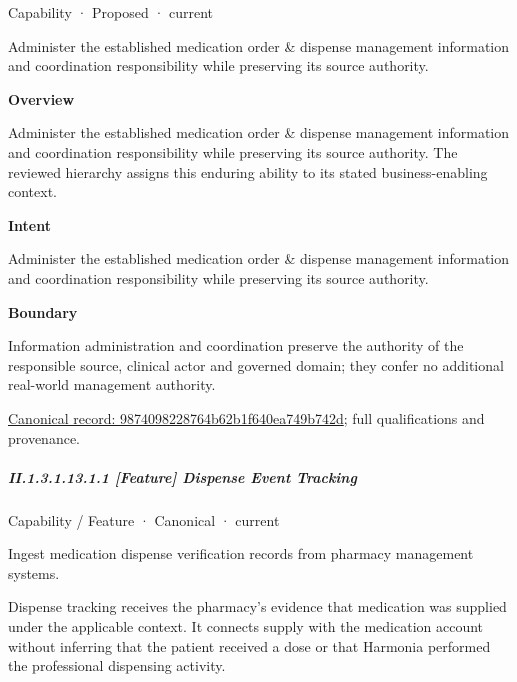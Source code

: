 \label{element:9874098228764b62b1f640ea749b742d}
{\small Capability · Proposed · current}\par

Administer the established medication order \& dispense management information and coordination responsibility while preserving its source authority.



\textbf{Overview}



Administer the established medication order \& dispense management information and coordination responsibility while preserving its source authority. The reviewed hierarchy assigns this enduring ability to its stated business-enabling context.



\textbf{Intent}



Administer the established medication order \& dispense management information and coordination responsibility while preserving its source authority.



\textbf{Boundary}



Information administration and coordination preserve the authority of the responsible source, clinical actor and governed domain; they confer no additional real-world management authority.


{\footnotesize \href{../../../../continuum/strategy/capability/9874098228764b62b1f640ea749b742d.md}{Canonical record: 9874098228764b62b1f640ea749b742d}; full qualifications and provenance.}\par
\subparagraph*{II.1.3.1.13.1.1 [Feature] Dispense Event Tracking}
\label{navigation:II.1.3.1.13.1.1}

\label{element:430bf990d4194255b7ae09c2fe27367e}
{\small Capability / Feature · Canonical · current}\par

Ingest medication dispense verification records from pharmacy management systems.



Dispense tracking receives the pharmacy's evidence that medication was supplied under the applicable context. It connects supply with the medication account without inferring that the patient received a dose or that Harmonia performed the professional dispensing activity.


